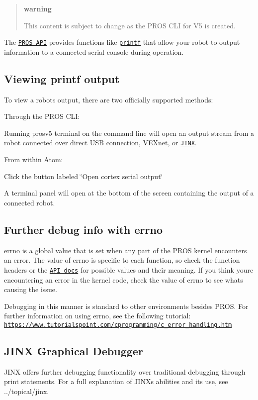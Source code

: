\begin{quote}
{\bfseries warning}

This content is subject to change as the P\+R\+OS C\+LI for V5 is created. \end{quote}


The \href{../../api/index.html}{\tt P\+R\+OS A\+PI} provides functions like \href{http://www.cplusplus.com/reference/cstdio/printf/}{\tt printf} that allow your robot to output information to a connected serial console during operation.

\subsection*{Viewing printf output}

To view a robot\textquotesingle{}s output, there are two officially supported methods\+:


\begin{DoxyEnumerate}
\item Through the P\+R\+OS C\+LI\+:

Running {\ttfamily prosv5 terminal} on the command line will open an output stream from a robot connected over direct U\+SB connection, V\+E\+Xnet, or \href{./tutorials/topical/jinx.html}{\tt J\+I\+NX}.
\item From within Atom\+:

Click the button labeled \char`\"{}\+Open cortex serial output\char`\"{}
\end{DoxyEnumerate}



A terminal panel will open at the bottom of the screen containing the output of a connected robot.



\subsection*{Further debug info with {\ttfamily errno}}

{\ttfamily errno} is a global value that is set when any part of the P\+R\+OS kernel encounters an error. The value of {\ttfamily errno} is specific to each function, so check the function headers or the \href{../../api/index.html}{\tt A\+PI docs} for possible values and their meaning. If you think you\textquotesingle{}re encountering an error in the kernel code, check the value of {\ttfamily errno} to see what\textquotesingle{}s causing the issue.

Debugging in this manner is standard to other environments besides P\+R\+OS. For further information on using {\ttfamily errno}, see the following tutorial\+: \href{https://www.tutorialspoint.com/cprogramming/c_error_handling.htm}{\tt https\+://www.\+tutorialspoint.\+com/cprogramming/c\+\_\+error\+\_\+handling.\+htm}

\subsection*{J\+I\+NX Graphical Debugger}

J\+I\+NX offers further debugging functionality over traditional debugging through print statements. For a full explanation of J\+I\+NX\textquotesingle{}s abilities and its use, see ../topical/jinx. 